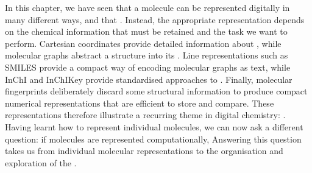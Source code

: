 In this chapter, we have seen that a molecule can be represented digitally in many different ways, and that .
Instead, the appropriate representation depends on the chemical information that must be retained and the task we want to perform.
Cartesian coordinates provide detailed information about , while molecular graphs abstract a structure into its .
Line representations such as SMILES provide a compact way of encoding molecular graphs as text, while InChI and InChIKey provide standardised approaches to .
Finally, molecular fingerprints deliberately discard some structural information to produce compact numerical representations that are efficient to store and compare.
These representations therefore illustrate a recurring theme in digital chemistry: .
Having learnt how to represent individual molecules, we can now ask a different question: if molecules are represented computationally, 
Answering this question takes us from individual molecular representations to the organisation and exploration of the .

